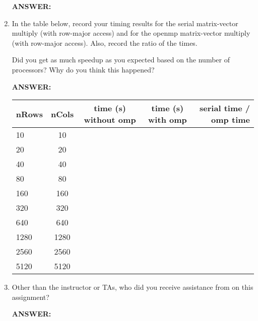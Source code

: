 \documentclass[letter]{article}
\begin{document}
\begin{enumerate}
        \textbf{ANSWER:} %
       
        \item In the table below, record your timing results for the serial matrix-vector multiply (with row-major access) and for the openmp matrix-vector multiply (with row-major access).   Also, record the ratio of the times.

        Did you get as much speedup as you expected based on the number of processors? Why do you think this happened?
        
        \textbf{ANSWER:} %

         \begin{center}
        \begin{tabular}{|l | c | c | c |r |} 
        \hline
        \textbf{nRows} & \textbf{nCols} & \textbf{time (s) without omp} & \textbf{time (s) with omp} & \textbf{serial time / omp time} \\ \hline
        10 & 10 & & &   \\
        20 & 20 & & &   \\
        40 & 40 & & &  \\
        80 & 80 & & &  \\
        160 & 160 & &  &  \\
        320 & 320 & & &  \\
        640 & 640 & & &  \\
        1280 & 1280 & & & \\ 
        2560 & 2560 & & &  \\
        5120 & 5120 & & &  \\\hline
        \end{tabular}
        \end{center}

        \item Other than the instructor or TAs, who did you receive assistance from on this assignment?
        
        \textbf{ANSWER:} %
        
    \end{enumerate}
\end{document}
